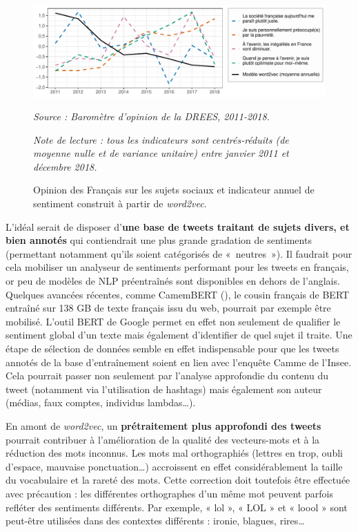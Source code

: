\documentclass[11pt,french,french]{article}
\begin{document}
\begin{figure}[htp]
{\centering \includegraphics[width =\textwidth]{img/rmd-graphConclu-1}}
\captionsetup{margin=0cm,format=hang,justification=justified}
\caption{Opinion des Français sur les sujets sociaux et indicateur annuel de sentiment construit à partir de \emph{word2vec}.}\label{fig:figconclu}
\footnotesize
\emph{Source : Baromètre d'opinion de la DREES, 2011-2018.}

\emph{Note de lecture : tous les indicateurs sont centrés-réduits (de moyenne nulle et de variance unitaire) entre janvier 2011 et décembre 2018.}
\end{figure}

L'idéal serait de disposer d'\textbf{une base de tweets traitant de sujets divers, et bien annotés} qui contiendrait une plus grande gradation de sentiments (permettant notamment qu'ils soient catégorisés de «~neutres~»).
Il faudrait pour cela mobiliser un analyseur de sentiments performant pour les tweets en français, or peu de modèles de NLP préentraînés sont disponibles en dehors de l'anglais.
Quelques avancées récentes, comme CamemBERT (\cite{Martin}), le cousin français de BERT entraîné sur 138 GB de texte français issu du web, pourrait par exemple être mobilisé.
L'outil BERT de Google permet en effet non seulement de qualifier le sentiment global d'un texte mais également d'identifier de quel sujet il traite.
Une étape de sélection de données semble en effet indispensable pour que les tweets annotés de la base d'entraînement soient en lien avec l'enquête Camme de l'Insee.
Cela pourrait passer non seulement par l'analyse approfondie du contenu du tweet (notamment via l'utilisation de hashtags) mais également son auteur (médias, faux comptes, individus lambdas\dots).

En amont de \emph{word2vec}, un \textbf{prétraitement plus approfondi des tweets} pourrait contribuer à l'amélioration de la qualité des vecteurs-mots et à la réduction des mots inconnus.
Les mots mal orthographiés (lettres en trop, oubli d'espace, mauvaise ponctuation\dots) accroissent en effet considérablement la taille du vocabulaire et la rareté des mots.
Cette correction doit toutefois être effectuée avec précaution : les différentes orthographes d'un même mot peuvent parfois refléter des sentiments différents.
Par exemple, « lol », « LOL » et « loool » sont peut-être utilisées dans des contextes différents : ironie, blagues, rires\dots 
\end{document}
